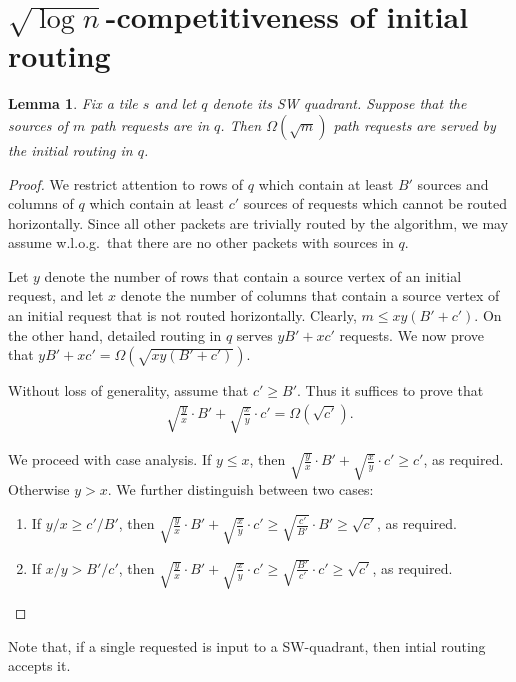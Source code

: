 \documentclass[11pt]{article}
\newtheorem{lemma}[theorem]{Lemma}
\newenvironment{proof sketch}[1]{\noindent {\emph{Proof sketch of #1:}}}{\hfill \qed}
\begin{document}
\section{$\sqrt{\log n}$-competitiveness of initial routing}
\begin{lemma}\label{lemma:SW}
  Fix a tile $s$ and let $q$ denote its SW quadrant.
  Suppose that the sources of $m$  path requests are in $q$. Then
  $\Omega(\sqrt{m})$ path requests are served by the initial
  routing in $q$.
\end{lemma}
\begin{proof}
We restrict attention to rows of $q$ which contain at least $B'$
  sources and  columns of $q$ which contain at least $c'$ sources of requests
  which cannot be
  routed horizontally. Since all other packets are trivially routed by the
  algorithm, we may assume w.l.o.g.\ that there are no other packets
  with sources in $q$.


{Let $y$ denote the number of rows that contain a source vertex of
  an initial request, and let $x$ denote the number of columns that
  contain a source vertex of an initial request that is not routed
  horizontally.}
  Clearly, $m\leq xy (B'+c')$. On the other hand, detailed routing in
  $q$ serves $yB'+xc'$ requests. We now prove that $yB'+xc' =
  \Omega(\sqrt{xy (B'+c')})$.

Without loss of generality, assume that
  $c'\geq B'$. Thus it suffices to prove that
\begin{align*}
  \sqrt{\frac yx}\cdot B'+\sqrt{\frac xy}\cdot c' = \Omega(\sqrt{c'}).
\end{align*}


We proceed with case analysis.  If $y\leq x$, then $\sqrt{\frac
  yx}\cdot B'+\sqrt{\frac xy}\cdot c'\geq c'$, as
  required.
Otherwise $y>x$.  We further distinguish between two cases:
  \begin{enumerate}
  \item If $y/x\geq c'/B'$, then $\sqrt{\frac yx}\cdot B'+\sqrt{\frac xy}\cdot c'\geq
    \sqrt{\frac{c'}{B'}}\cdot B' \geq \sqrt{c'}$, as required.
  \item If $x/y > B'/c'$, then $\sqrt{\frac yx}\cdot
      B'+\sqrt{\frac xy}\cdot c'\geq
      \sqrt{\frac{B'}{c'}}\cdot c' \geq \sqrt{c'}$, as
      required.
  \end{enumerate}
\end{proof}

Note that, if a single requested is input to a SW-quadrant,
then intial routing accepts it.
\end{document}
